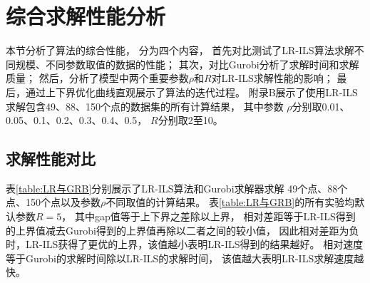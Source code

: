 \section{综合求解性能分析}
\label{sec:综合性能}

本节分析了算法的综合性能，
分为四个内容，
首先对比测试了LR-ILS算法求解不同规模、不同参数取值的数据的性能；
其次，对比Gurobi分析了求解时间和求解质量；
然后，分析了模型中两个重要参数$\rho$和$R$对LR-ILS求解性能的影响；
最后，通过上下界优化曲线直观展示了算法的迭代过程。
附录B展示了使用LR-ILS求解包含49、88、150个点的数据集的所有计算结果，
其中参数
$\rho$分别取0.01、0.05、0.1、0.2、0.3、0.4、0.5，
$R$分别取2至10。

\subsection{求解性能对比}
表\ref{table:LR与GRB}分别展示了LR-ILS算法和Gurobi求解器求解
49个点、88个点、150个点以及参数$\rho$不同取值的计算结果。
表\ref{table:LR与GRB}的所有实验均默认参数$R=5$，
其中gap值等于上下界之差除以上界，
相对差距等于LR-ILS得到的上界值减去Gurobi得到的上界值再除以二者之间的较小值，
因此相对差距为负时，LR-ILS获得了更优的上界，该值越小表明LR-ILS得到的结果越好。
相对速度等于Gurobi的求解时间除以LR-ILS的求解时间，
该值越大表明LR-ILS求解速度越快。

